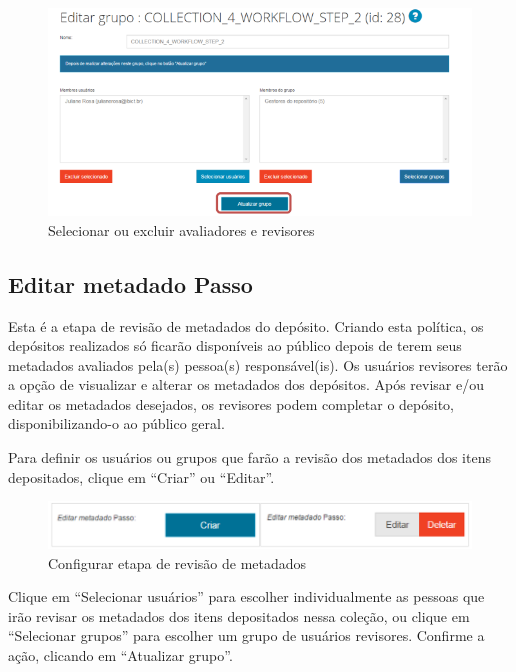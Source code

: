 \documentclass[12pt,hidelinks]{article}
\begin{document}
    \begin{figure}[!htp]
                \centering
                \includegraphics[scale=0.8]{figura/Figura47.png}
                \caption{Selecionar ou excluir avaliadores e revisores}
            \label{Rotulo}
        \end{figure}
    
\newpage

    \subsection{Editar metadado Passo}
    
    Esta é a etapa de revisão de metadados do depósito. Criando esta política, os depósitos realizados só ficarão disponíveis ao público depois de terem seus metadados avaliados pela(s) pessoa(s) responsável(is). Os usuários revisores terão a opção de visualizar e alterar os metadados dos depósitos. Após revisar e/ou editar os metadados desejados, os revisores podem completar o depósito, disponibilizando-o ao público geral.
    
    \singlespacing
    
    Para definir os usuários ou grupos que farão a revisão dos metadados dos itens depositados, clique em “Criar” ou “Editar”.
    
    \begin{figure}[!htp]
                \centering
                \includegraphics[scale=0.6]{figura/Figura48.png}
                \caption{Configurar etapa de revisão de metadados}
            \label{Rotulo}
        \end{figure}
    
    Clique em “Selecionar usuários” para escolher individualmente as pessoas que irão revisar os metadados dos itens depositados nessa coleção, ou clique em “Selecionar grupos” para escolher um grupo de usuários revisores. Confirme a ação, clicando em “Atualizar grupo”.
    
\end{document}
